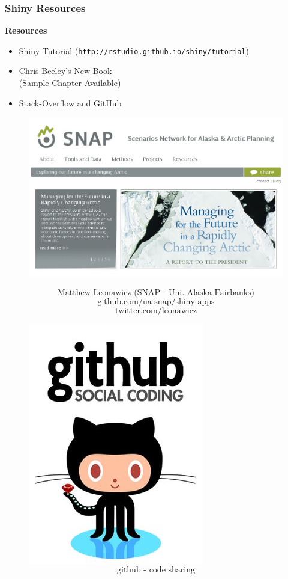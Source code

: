 \documentclass{beamer}
\begin{document}
\begin{frame}
\Large
\frametitle{Shiny Resources}
\vspace{-1.5cm}
\textbf{Resources}
\begin{itemize}

\item Shiny Tutorial (\texttt{http://rstudio.github.io/shiny/tutorial})
\item Chris Beeley's New Book\\ (Sample Chapter Available)
\item Stack-Overflow and GitHub 
\end{itemize}

\end{frame}
\begin{frame}
\begin{figure}
\vspace{0.5cm}
\centering
\includegraphics[width=0.75\linewidth]{./snap2}

\end{figure}
\Large
\[ \mbox{Matthew Leonawicz (SNAP - Uni. Alaska Fairbanks)}  \]
\[\mbox{github.com/ua-snap/shiny-apps}‎\]
\[ \mbox{twitter.com/leonawicz} \]

\end{frame}

\begin{frame}
\begin{figure}

\centering
\includegraphics[width=0.55\linewidth]{./github}
\[ \mbox{github - code sharing}  \]
\end{figure}
\Large


\end{frame}
\end{document}
